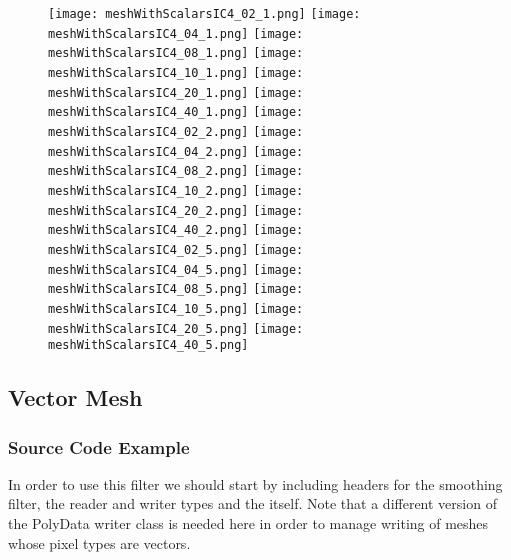 \documentclass{InsightArticle}
\begin{document}
\begin{figure}
\center
\texttt{[image: meshWithScalarsIC4\_02\_1.png]}
\texttt{[image: meshWithScalarsIC4\_04\_1.png]}
\texttt{[image: meshWithScalarsIC4\_08\_1.png]}
\texttt{[image: meshWithScalarsIC4\_10\_1.png]}
\texttt{[image: meshWithScalarsIC4\_20\_1.png]}
\texttt{[image: meshWithScalarsIC4\_40\_1.png]}
\texttt{[image: meshWithScalarsIC4\_02\_2.png]}
\texttt{[image: meshWithScalarsIC4\_04\_2.png]}
\texttt{[image: meshWithScalarsIC4\_08\_2.png]}
\texttt{[image: meshWithScalarsIC4\_10\_2.png]}
\texttt{[image: meshWithScalarsIC4\_20\_2.png]}
\texttt{[image: meshWithScalarsIC4\_40\_2.png]}
\texttt{[image: meshWithScalarsIC4\_02\_5.png]}
\texttt{[image: meshWithScalarsIC4\_04\_5.png]}
\texttt{[image: meshWithScalarsIC4\_08\_5.png]}
\texttt{[image: meshWithScalarsIC4\_10\_5.png]}
\texttt{[image: meshWithScalarsIC4\_20\_5.png]}
\texttt{[image: meshWithScalarsIC4\_40\_5.png]}
\label{fig:ScalarIC4Smoothings}
\end{figure}

\clearpage

\subsection{Vector Mesh}

\subsubsection{Source Code Example}

In order to use this filter we should start by including headers for the
smoothing filter, the reader and writer types and the 
itself.  Note that a different version of the PolyData writer class is needed
here in order to manage writing of meshes whose pixel types are vectors.
\end{document}
